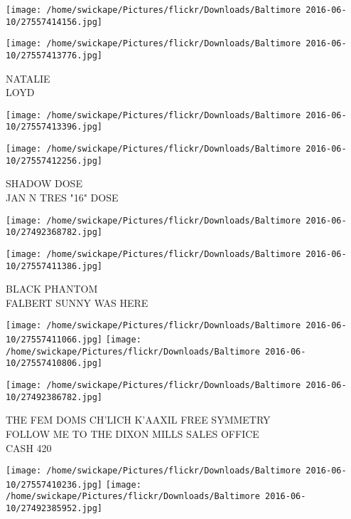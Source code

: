 \documentclass[10pt,letterpaper]{article}
\begin{document}
\texttt{[image: /home/swickape/Pictures/flickr/Downloads/Baltimore 2016-06-10/27557414156.jpg]}

\vspace{0.25in}
\texttt{[image: /home/swickape/Pictures/flickr/Downloads/Baltimore 2016-06-10/27557413776.jpg]}

NATALIE\\
LOYD\\
\pagebreak

\texttt{[image: /home/swickape/Pictures/flickr/Downloads/Baltimore 2016-06-10/27557413396.jpg]}

\vspace{0.25in}
\texttt{[image: /home/swickape/Pictures/flickr/Downloads/Baltimore 2016-06-10/27557412256.jpg]}

SHADOW DOSE\\
JAN N TRES "16" DOSE\\
\pagebreak

\texttt{[image: /home/swickape/Pictures/flickr/Downloads/Baltimore 2016-06-10/27492368782.jpg]}

\vspace{0.25in}
\texttt{[image: /home/swickape/Pictures/flickr/Downloads/Baltimore 2016-06-10/27557411386.jpg]}

BLACK PHANTOM\\
FALBERT SUNNY WAS HERE\\
\pagebreak

\texttt{[image: /home/swickape/Pictures/flickr/Downloads/Baltimore 2016-06-10/27557411066.jpg]}
\texttt{[image: /home/swickape/Pictures/flickr/Downloads/Baltimore 2016-06-10/27557410806.jpg]}

\vspace{0.25in}
\texttt{[image: /home/swickape/Pictures/flickr/Downloads/Baltimore 2016-06-10/27492386782.jpg]}

THE FEM DOMS CH'LICH K'AAXIL FREE SYMMETRY\\
FOLLOW ME TO THE DIXON MILLS SALES OFFICE\\
CASH 420\\
\pagebreak

\texttt{[image: /home/swickape/Pictures/flickr/Downloads/Baltimore 2016-06-10/27557410236.jpg]}
\texttt{[image: /home/swickape/Pictures/flickr/Downloads/Baltimore 2016-06-10/27492385952.jpg]}
\end{document}
